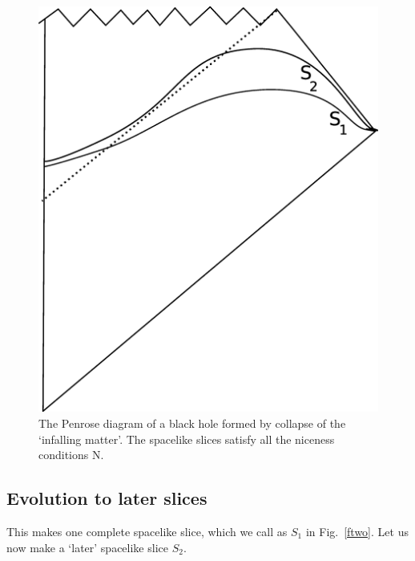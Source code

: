 \documentclass[12pt]{article}
\begin{document}
\begin{figure}[tbp]
\begin{center}
\includegraphics[scale=.25]{fthree.eps}
\caption{{The Penrose diagram of a black hole formed by collapse of the `infalling matter'. The spacelike slices satisfy all the niceness conditions N.}}
\label{fthree}
\end{center}
\end{figure}


\subsection{Evolution to later slices}


This makes one complete spacelike slice, which we call as ${ S}_1$ in Fig.~\ref{ftwo}. Let us now make a   `later' spacelike slice ${ S}_2$.
\end{document}
